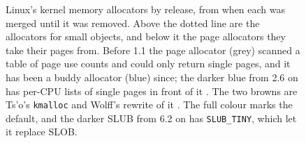 \begin{figure}[!htbp]
\caption{Linux's kernel memory allocators by release, from when each was
         merged until it was removed. Above the dotted line are the
         allocators for small objects, and below it the page allocators
         they take their pages from. Before 1.1 the page allocator (grey)
         scanned a table of page use counts and could only return single
         pages, and it has been a buddy allocator (blue) since; the
         darker blue from 2.6 on has per-CPU lists of single pages in front
         of it
         \cite{linux-1.1.0-diff,gorman2004vmm}. The two browns are Ts'o's \texttt{kmalloc} and Wolff's rewrite
         of it \cite{linux-0.11-source,linux-1.0-source}. The full colour marks the
         default, and the darker SLUB from 6.2 on has
         \texttt{SLUB\_TINY}, which let it replace SLOB.}
\label{fig:linux-slab-timeline}
\end{figure}
